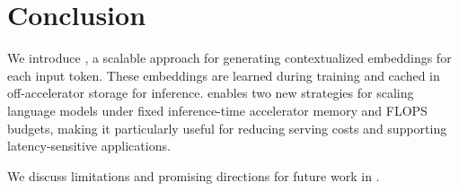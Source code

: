 
\section{Conclusion}\label{sec:conclusion}

We introduce \SCONE, a scalable approach for generating  contextualized embeddings for each input token. These embeddings are learned during training and cached in off-accelerator storage for inference. \SCONE enables two new strategies for scaling language models under fixed inference-time accelerator memory and FLOPS budgets, making it particularly useful for reducing serving costs and supporting latency-sensitive applications.

We discuss limitations and promising directions for future work in .